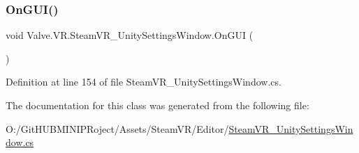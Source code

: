 \subsubsection{\texorpdfstring{OnGUI()}{OnGUI()}}
{\footnotesize\ttfamily void Valve.\+V\+R.\+Steam\+V\+R\+\_\+\+Unity\+Settings\+Window.\+On\+G\+UI (\begin{DoxyParamCaption}{ }\end{DoxyParamCaption})}



Definition at line 154 of file Steam\+V\+R\+\_\+\+Unity\+Settings\+Window.\+cs.



The documentation for this class was generated from the following file\+:\begin{DoxyCompactItemize}
\item 
O\+:/\+Git\+H\+U\+B\+M\+I\+N\+I\+P\+Roject/\+Assets/\+Steam\+V\+R/\+Editor/\mbox{\hyperlink{_steam_v_r___unity_settings_window_8cs}{Steam\+V\+R\+\_\+\+Unity\+Settings\+Window.\+cs}}\end{DoxyCompactItemize}
